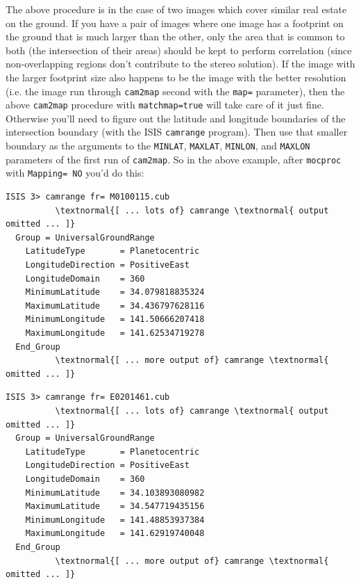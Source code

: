 The above procedure is in the case of two images which cover similar
real estate on the ground.  If you have a pair of images where one
image has a footprint on the ground that is much larger than the
other, only the area that is common to both (the intersection of their
areas) should be kept to perform correlation (since non-overlapping
regions don't contribute to the stereo solution).  If the image with
the larger footprint size also happens to be the image with the better
resolution (i.e. the image run through \texttt{cam2map} second with
the \texttt{map=} parameter), then the above \texttt{cam2map}
procedure with \texttt{matchmap=true} will take care of it just fine.
Otherwise you'll need to figure out the latitude and longitude
boundaries of the intersection boundary (with the \ac{ISIS}
\texttt{camrange} program).  Then use that smaller boundary as the
arguments to the \texttt{MINLAT}, \texttt{MAXLAT}, \texttt{MINLON},
and \texttt{MAXLON} parameters of the first run of \texttt{cam2map}.
So in the above example, after \texttt{mocproc} with \texttt{Mapping=
  NO} you'd do this:

\begin{Verbatim}[commandchars=\\\{\}]
  ISIS 3> camrange fr= M0100115.cub
          \textnormal{[ ... lots of} camrange \textnormal{ output omitted ... ]}
  Group = UniversalGroundRange
    LatitudeType       = Planetocentric
    LongitudeDirection = PositiveEast
    LongitudeDomain    = 360
    MinimumLatitude    = 34.079818835324
    MaximumLatitude    = 34.436797628116
    MinimumLongitude   = 141.50666207418
    MaximumLongitude   = 141.62534719278
  End_Group
          \textnormal{[ ... more output of} camrange \textnormal{ omitted ... ]}
\end{Verbatim}

\begin{Verbatim}[commandchars=\\\{\}]
  ISIS 3> camrange fr= E0201461.cub
          \textnormal{[ ... lots of} camrange \textnormal{ output omitted ... ]}
  Group = UniversalGroundRange
    LatitudeType       = Planetocentric
    LongitudeDirection = PositiveEast
    LongitudeDomain    = 360
    MinimumLatitude    = 34.103893080982
    MaximumLatitude    = 34.547719435156
    MinimumLongitude   = 141.48853937384
    MaximumLongitude   = 141.62919740048
  End_Group
          \textnormal{[ ... more output of} camrange \textnormal{ omitted ... ]}
\end{Verbatim}

\pagebreak

